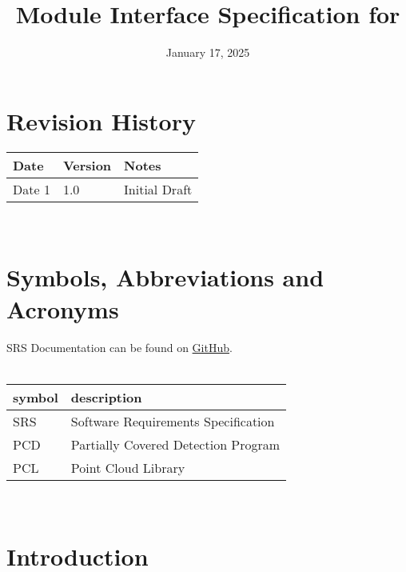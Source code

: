 \documentclass[12pt, titlepage]{article}
\begin{document}
\title{Module Interface Specification for \progname{}}

\author{\authname}

\date{January 17, 2025}

\maketitle


\section{Revision History}

\begin{tabularx}{\textwidth}{p{3cm}p{2cm}X}
\toprule {\bf Date} & {\bf Version} & {\bf Notes}\\
\midrule
Date 1 & 1.0 & Initial Draft\\
\bottomrule
\end{tabularx}

~\newpage

\section{Symbols, Abbreviations and Acronyms}

SRS Documentation can be found on \href{https://github.com/takhtart/PCD/blob/main/docs/SRS/SRS.pdf}{GitHub}.\\
\\
\renewcommand{\arraystretch}{1.2}
\begin{tabular}{l l} 
  \toprule		
  \textbf{symbol} & \textbf{description}\\
  \midrule 
  SRS & Software Requirements Specification\\
  PCD & Partially Covered Detection Program \\
  PCL & Point Cloud Library \\
  \bottomrule
\end{tabular}\\

\newpage

\tableofcontents

\newpage


\section{Introduction}
\end{document}
